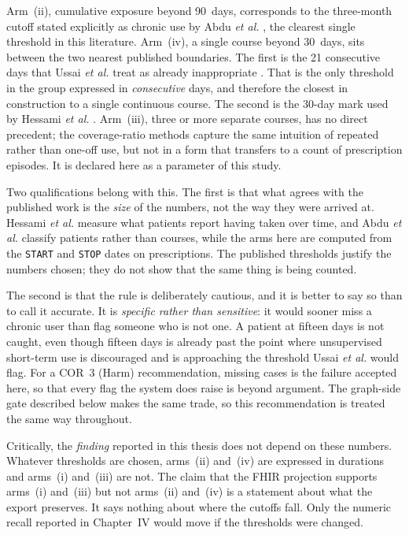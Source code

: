 Arm~(ii), cumulative exposure beyond 90~days, corresponds to the three-month cutoff stated
explicitly as chronic use by Abdu \textit{et al.} \cite{abdu2020}, the
clearest single threshold in this literature. Arm~(iv), a single course beyond 30~days, sits
between the two nearest published boundaries. The first is the 21 consecutive days
that Ussai \textit{et al.} treat as already inappropriate
\cite{ussai2015}. That is the only threshold in the group expressed in
\emph{consecutive} days, and therefore the closest in construction to a single continuous
course. The second is the 30-day mark used by Hessami \textit{et al.}
\cite{hessami2025}. Arm~(iii), three or more separate courses, has no direct
precedent; the coverage-ratio methods \cite{campbell2022}\cite{kikuchi2021}
capture the same intuition of repeated rather than one-off use, but not in a form that
transfers to a count of prescription episodes. It is declared here as a parameter of this
study.

Two qualifications belong with this. The first is that what agrees with the
published work is the \emph{size} of the numbers, not the way they were arrived at. Hessami
\textit{et al.} measure what patients report having taken over time, and Abdu \textit{et al.}
classify patients rather than courses, while the arms here are computed from the
\texttt{START} and \texttt{STOP} dates on prescriptions. The published thresholds justify the
numbers chosen; they do not show that the same thing is being counted.

The second is that the rule is deliberately cautious, and it is better to say so than to call
it accurate. It is \emph{specific rather than sensitive}: it would sooner miss a chronic user
than flag someone who is not one. A patient at fifteen days is not caught, even though fifteen
days is already past the point where unsupervised short-term use is discouraged
\cite{aminoshariae2016} and is approaching the threshold Ussai \textit{et al.} would flag. For
a COR~3 (Harm) recommendation, missing cases is the failure accepted here, so that every flag
the system does raise is beyond argument. The graph-side gate described below makes the same
trade, so this recommendation is treated the same way throughout.

Critically, the \emph{finding} reported in this thesis does not depend on these numbers.
Whatever thresholds are chosen, arms~(ii) and~(iv) are expressed in durations and arms~(i)
and~(iii) are not. The claim that the FHIR projection supports arms~(i) and~(iii) but not
arms~(ii) and~(iv) is a statement about what the export preserves. It says nothing about
where the cutoffs fall. Only the
numeric recall reported in Chapter~IV would move if the thresholds were changed.


